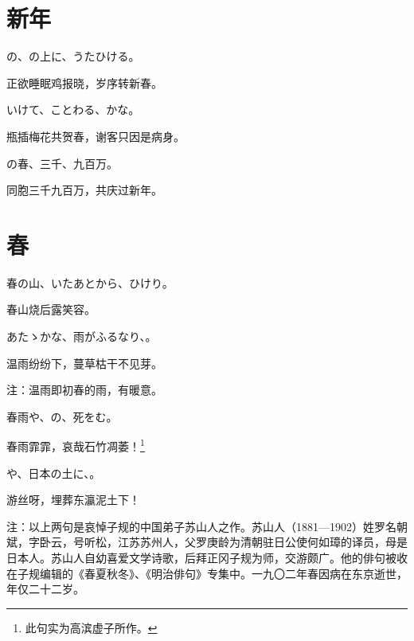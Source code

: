 \newpage

\section{\FK 新年}

\setcounter{haikucounter}{0}

\begin{haiku}
    {\FH {}の、の上に、うたひける。}

    {\FK 正欲睡眠鸡报晓，岁序转新春。}
\end{haiku}

\begin{haiku}
    {\FH {}いけて、ことわる、かな。}

    {\FK 瓶插梅花共贺春，谢客只因是病身。}
\end{haiku}

\begin{haiku}
    {\FH {}の春、三千、九百万。}

    {\FK 同胞三千九百万，共庆过新年。}
\end{haiku}

\section{\FK 春}

\setcounter{haikucounter}{0}

\begin{haiku}
    {\FH 春の山、いたあとから、ひけり。}

    {\FK 春山烧后露笑容。}
\end{haiku}

\begin{haiku}
    {\FH あたゝかな、雨がふるなり、。}

    {\FK 温雨纷纷下，蔓草枯干不见芽。}

    {\FT 注：温雨即初春的雨，有暖意。}
\end{haiku}

\begin{haiku}
    {\FH 春雨や、の、死をむ。}

    {\FK 春雨霏霏，哀哉石竹凋萎！\footnote{\FT 此句实为高滨虚子所作。}}
\end{haiku}

\begin{haiku}
    {\FH {}や、日本の土に、。}

    {\FK 游丝呀，埋葬东瀛泥土下！}

    {\FT 注：以上两句是哀悼子规的中国弟子苏山人之作。苏山人（1881—1902）姓罗名朝斌，字卧云，号听松，江苏苏州人，父罗庚龄为清朝驻日公使何如璋的译员，母是日本人。苏山人自幼喜爱文学诗歌，后拜正冈子规为师，交游颇广。他的俳句被收在子规编辑的《春夏秋冬》、《明治俳句》专集中。一九〇二年春因病在东京逝世，年仅二十二岁。}
\end{haiku}

